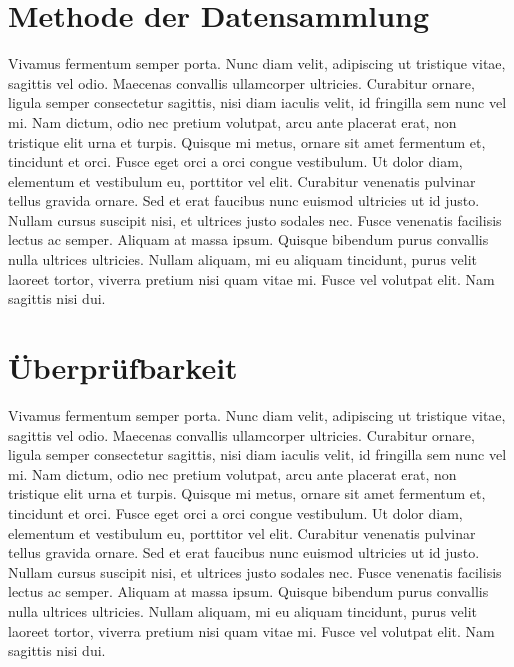\section{Methode der Datensammlung}
Vivamus fermentum semper porta. Nunc diam velit, adipiscing ut tristique vitae, sagittis vel odio. Maecenas convallis ullamcorper ultricies. Curabitur ornare, ligula semper consectetur sagittis, nisi diam iaculis velit, id fringilla sem nunc vel mi. Nam dictum, odio nec pretium volutpat, arcu ante placerat erat, non tristique elit urna et turpis. Quisque mi metus, ornare sit amet fermentum et, tincidunt et orci. Fusce eget orci a orci congue vestibulum. Ut dolor diam, elementum et vestibulum eu, porttitor vel elit. Curabitur venenatis pulvinar tellus gravida ornare. Sed et erat faucibus nunc euismod ultricies ut id justo. Nullam cursus suscipit nisi, et ultrices justo sodales nec. Fusce venenatis facilisis lectus ac semper. Aliquam at massa ipsum. Quisque bibendum purus convallis nulla ultrices ultricies. Nullam aliquam, mi eu aliquam tincidunt, purus velit laoreet tortor, viverra pretium nisi quam vitae mi. Fusce vel volutpat elit. Nam sagittis nisi dui.

\section{Überprüfbarkeit}
Vivamus fermentum semper porta. Nunc diam velit, adipiscing ut tristique vitae, sagittis vel odio. Maecenas convallis ullamcorper ultricies. Curabitur ornare, ligula semper consectetur sagittis, nisi diam iaculis velit, id fringilla sem nunc vel mi. Nam dictum, odio nec pretium volutpat, arcu ante placerat erat, non tristique elit urna et turpis. Quisque mi metus, ornare sit amet fermentum et, tincidunt et orci. Fusce eget orci a orci congue vestibulum. Ut dolor diam, elementum et vestibulum eu, porttitor vel elit. Curabitur venenatis pulvinar tellus gravida ornare. Sed et erat faucibus nunc euismod ultricies ut id justo. Nullam cursus suscipit nisi, et ultrices justo sodales nec. Fusce venenatis facilisis lectus ac semper. Aliquam at massa ipsum. Quisque bibendum purus convallis nulla ultrices ultricies. Nullam aliquam, mi eu aliquam tincidunt, purus velit laoreet tortor, viverra pretium nisi quam vitae mi. Fusce vel volutpat elit. Nam sagittis nisi dui.